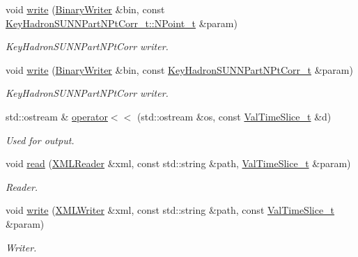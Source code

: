 \begin{DoxyCompactItemize}
void \mbox{\hyperlink{namespaceHadron_acd7055ec4bbdda7ceb335f7271aee72e}{write}} (\mbox{\hyperlink{classADATIO_1_1BinaryWriter}{Binary\+Writer}} \&bin, const \mbox{\hyperlink{structHadron_1_1KeyHadronSUNNPartNPtCorr__t_1_1NPoint__t}{Key\+Hadron\+S\+U\+N\+N\+Part\+N\+Pt\+Corr\+\_\+t\+::\+N\+Point\+\_\+t}} \&param)
\begin{DoxyCompactList}\small\item\em Key\+Hadron\+S\+U\+N\+N\+Part\+N\+Pt\+Corr writer. \end{DoxyCompactList}\item 
void \mbox{\hyperlink{namespaceHadron_a767bdf4c228c06edad1c47918ec75ed3}{write}} (\mbox{\hyperlink{classADATIO_1_1BinaryWriter}{Binary\+Writer}} \&bin, const \mbox{\hyperlink{structHadron_1_1KeyHadronSUNNPartNPtCorr__t}{Key\+Hadron\+S\+U\+N\+N\+Part\+N\+Pt\+Corr\+\_\+t}} \&param)
\begin{DoxyCompactList}\small\item\em Key\+Hadron\+S\+U\+N\+N\+Part\+N\+Pt\+Corr writer. \end{DoxyCompactList}\item 
std\+::ostream \& \mbox{\hyperlink{namespaceHadron_ab6f642c04562e34b1b2aa6e4bcfa60e7}{operator$<$$<$}} (std\+::ostream \&os, const \mbox{\hyperlink{structHadron_1_1ValTimeSlice__t}{Val\+Time\+Slice\+\_\+t}} \&d)
\begin{DoxyCompactList}\small\item\em Used for output. \end{DoxyCompactList}\item 
void \mbox{\hyperlink{namespaceHadron_aa4df93329eeddeec176cd9df5abe9ce1}{read}} (\mbox{\hyperlink{classADATXML_1_1XMLReader}{X\+M\+L\+Reader}} \&xml, const std\+::string \&path, \mbox{\hyperlink{structHadron_1_1ValTimeSlice__t}{Val\+Time\+Slice\+\_\+t}} \&param)
\begin{DoxyCompactList}\small\item\em Reader. \end{DoxyCompactList}\item 
void \mbox{\hyperlink{namespaceHadron_ab3f6a936fc8ba9b50904aca066146f48}{write}} (\mbox{\hyperlink{classADATXML_1_1XMLWriter}{X\+M\+L\+Writer}} \&xml, const std\+::string \&path, const \mbox{\hyperlink{structHadron_1_1ValTimeSlice__t}{Val\+Time\+Slice\+\_\+t}} \&param)
\begin{DoxyCompactList}\small\item\em Writer. \end{DoxyCompactList}\item 

\end{DoxyCompactItemize}
